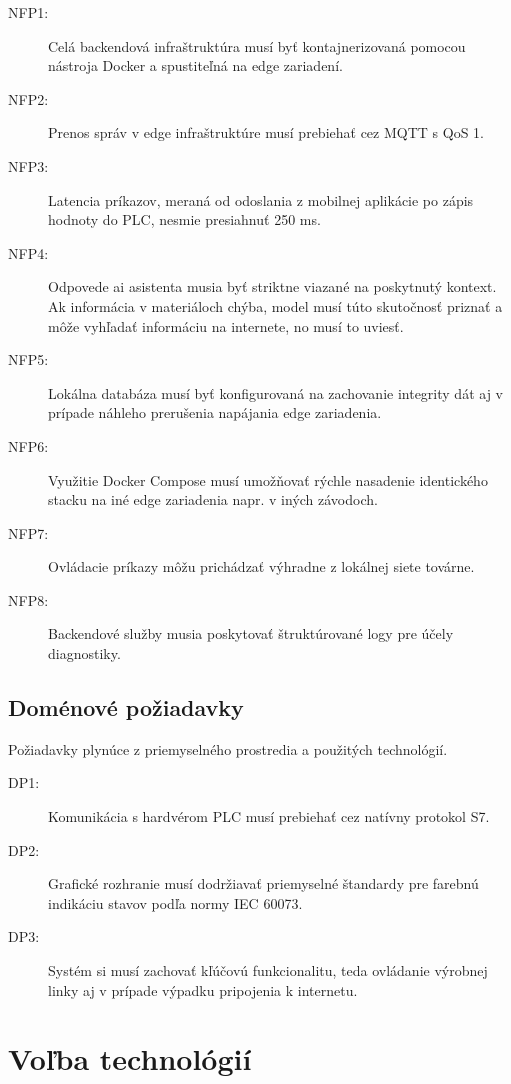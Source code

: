 \begin{description}
      \item [NFP1:] Celá backendová infraštruktúra musí byť kontajnerizovaná pomocou nástroja Docker a spustiteľná na edge zariadení.
      \item [NFP2:] Prenos správ v edge infraštruktúre musí prebiehať cez MQTT s QoS 1.
      \item [NFP3:] Latencia príkazov, meraná od odoslania z mobilnej aplikácie po zápis hodnoty do PLC, nesmie presiahnuť 250 ms.
      \item [NFP4:] Odpovede \acrshort{ai} asistenta musia byť striktne viazané na poskytnutý kontext. Ak informácia v materiáloch chýba, model musí túto skutočnosť priznať a môže vyhľadať informáciu na internete, no musí to uviesť.
      \item [NFP5:] Lokálna databáza musí byť konfigurovaná na zachovanie integrity dát aj v prípade náhleho prerušenia napájania edge zariadenia.
      \item [NFP6:] Využitie Docker Compose musí umožňovať rýchle nasadenie identického stacku na iné edge zariadenia napr. v iných závodoch.
      \item [NFP7:] Ovládacie príkazy môžu prichádzať výhradne z lokálnej siete továrne.
      \item [NFP8:] Backendové služby musia poskytovať štruktúrované logy pre účely diagnostiky.
\end{description}

\subsection{Doménové požiadavky}
Požiadavky plynúce z priemyselného prostredia a použitých technológií.

\begin{description}
      \item [DP1:] Komunikácia s hardvérom PLC musí prebiehať cez natívny protokol S7.
      \item [DP2:] Grafické rozhranie musí dodržiavať priemyselné štandardy pre farebnú indikáciu stavov podľa normy IEC 60073.
      \item [DP3:] Systém si musí zachovať kľúčovú funkcionalitu, teda ovládanie výrobnej linky aj v prípade výpadku pripojenia k internetu.
\end{description}

\section{Voľba technológií}

